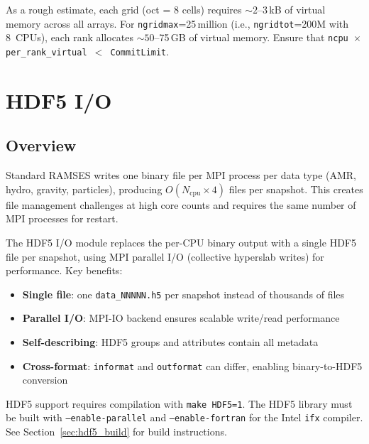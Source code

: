 \documentclass[11pt,fleqn]{book}
\begin{document}
\begin{remark}
As a rough estimate, each grid (oct = 8 cells) requires ${\sim}2$--$3$\,kB of virtual memory across all arrays. For \texttt{ngridmax}=25\,million (i.e., \texttt{ngridtot}=200M with 8~CPUs), each rank allocates ${\sim}50$--75\,GB of virtual memory. Ensure that \texttt{ncpu $\times$ per\_rank\_virtual $<$ CommitLimit}.
\end{remark}


\chapter{HDF5 I/O}
\label{ch:hdf5}

\section{Overview}

Standard RAMSES writes one binary file per MPI process per data type (AMR, hydro, gravity, particles), producing $O(N_{\text{cpu}} \times 4)$ files per snapshot. This creates file management challenges at high core counts and requires the same number of MPI processes for restart.

The HDF5 I/O module replaces the per-CPU binary output with a single HDF5 file per snapshot, using MPI parallel I/O (collective hyperslab writes) for performance. Key benefits:

\begin{itemize}[leftmargin=2em]
  \item \textbf{Single file}: one \texttt{data\_NNNNN.h5} per snapshot instead of thousands of files
  \item \textbf{Parallel I/O}: MPI-IO backend ensures scalable write/read performance
  \item \textbf{Self-describing}: HDF5 groups and attributes contain all metadata
  \item \textbf{Cross-format}: \texttt{informat} and \texttt{outformat} can differ, enabling binary-to-HDF5 conversion
\end{itemize}

\begin{infobox}[Compilation]
HDF5 support requires compilation with \texttt{make HDF5=1}. The HDF5 library must be built with \texttt{--enable-parallel} and \texttt{--enable-fortran} for the Intel \texttt{ifx} compiler. See Section~\ref{sec:hdf5_build} for build instructions.
\end{infobox}
\end{document}
